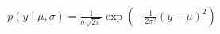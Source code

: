 \documentclass[preview]{standalone}
\begin{document}
\begin{align*}
p(y \mid \mu,\sigma)=\frac{1}{\sigma \sqrt{2 \pi}} \exp (-\frac{1}{2 \sigma^2}(y-\mu)^2)
\end{align*}
\end{document}

